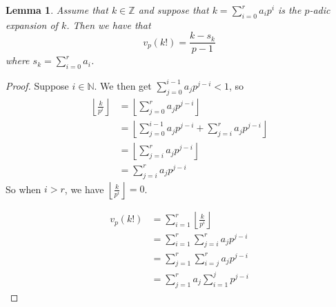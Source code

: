 \documentclass{article}
\newtheorem{lemma}{Lemma}[section]
\newcommand{\mbb}[1]{\mathbb{#1}}
\begin{document}
\begin{lemma}
    Assume that $k \in \mbb Z$ and suppose that $k = \sum_{i = 0}^{r} a_i p^i$ is the $p$-adic expansion of $k$. Then we have that 
    $$v_p(k!) = \frac{k - s_k}{p - 1}$$
    where $s_k = \sum_{i = 0}^{r} a_i$.
\end{lemma}
\begin{proof}
    Suppose $i \in \mbb N$. We then get $\sum_{j = 0}^{i-1}a_j p^{j-i} < 1$, so
    \begin{align*}
        \left\lfloor \frac{k}{p^i} \right \rfloor &= \left \lfloor \sum_{j = 0}^{r} a_j p^{j-i} \right \rfloor \\ 
        &= \left \lfloor \sum_{j = 0}^{i-1}a_j p^{j-i} + \sum_{j=i}^{r} a_j p^{j-i} \right \rfloor \\
        &=  \left \lfloor \sum_{j=i}^{r} a_j p^{j-i} \right \rfloor \\
        &= \sum_{j=i}^{r} a_j p^{j-i}
    \end{align*}
    So when $i > r$, we have $\left\lfloor \frac{k}{p^i} \right \rfloor = 0$.
    
    
    \begin{align*}
        v_p(k!) &= \sum_{i = 1}^{r} \left\lfloor \frac{k}{p^i} \right \rfloor \\
        &= \sum_{i = 1}^{r} \sum_{j=i}^{r} a_j p^{j-i} \\ 
        &= \sum_{j=1}^{r} \sum_{i = j}^{r} a_j p^{j-i} \\
        &= \sum_{j=1}^{r} a_j \sum_{i = 1}^{j} p^{j-i}
    \end{align*}


\end{proof}
\end{document}
